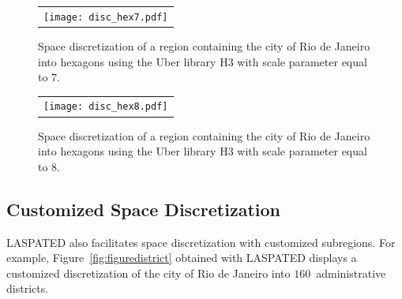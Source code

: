 \documentclass[article]{jss}
\newcommand{\ignore}[1]{}
\begin{document}
\begin{figure}
\centering
\begin{tabular}{c}
\texttt{[image: disc\_hex7.pdf]}
\end{tabular}
\caption{\label{fig:uber7}
Space discretization of a region containing the city of Rio de Janeiro into hexagons using the Uber library H3 with scale parameter equal to $7$.}
\end{figure}


\begin{figure}
\centering
\begin{tabular}{c}
\texttt{[image: disc\_hex8.pdf]}
\end{tabular}
\caption{\label{fig:uber8}
Space discretization of a region containing the city of Rio de Janeiro into hexagons using the Uber library H3 with scale parameter equal to $8$.}
\end{figure}


\subsection{Customized Space Discretization}

LASPATED also facilitates space discretization with customized subregions.
For example, Figure~\ref{fig:figuredistrict} obtained with LASPATED displays a customized discretization of the city of Rio de Janeiro into $160$~administrative districts.

\ignore{
First, a GeoDataFrame object containing the geometries of each subregion needs to be provided. 
Then the space discretization is obtained again with method {\textbf{add\_geo\_discretization}} specifying 'C' as \textbf{discr\_type} parameter and the GeoDataFrame object of the subregions as the additional parameter \textbf{custom\_data}. 
For instance, in Example \ref{list:8} where the studied area is the city of Rio de Janeiro, we take as subregions the administrative districts.
The corresponding GeoDataFrame object, denoted by custom\_map in the example, is obtained from the shapefile rio\_neighborhoods.shp of the districts of the city (this shape file can be found on the GitHub webpage of the project).

\begin{lstlisting}[label={list:8},caption=Custom discretization.]
import geopandas as gpd
custom_map = gpd.read_file(r'../Data/rio_de_janeiro_neighborhoods/rio_neighborhoods.shp')
app.add_geo_discretization('C', custom_data=custom_map)

# Plotting the regions
app.geo_discretization.boundary.plot()
plt.show()
\end{lstlisting}
}
\end{document}
